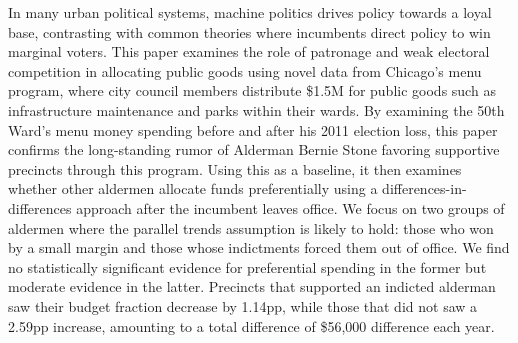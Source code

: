 \begin{spacing}{1.0}
    In many urban political systems, machine politics drives policy towards a loyal base, contrasting with common theories where incumbents direct policy to win marginal voters.
    This paper examines the role of patronage and weak electoral competition in allocating public goods using novel data from Chicago's menu program, where city council members distribute \$1.5M for public goods such as infrastructure maintenance and parks within their wards.
    By examining the 50th Ward's menu money spending before and after his 2011 election loss, this paper confirms the long-standing rumor of Alderman Bernie Stone favoring supportive precincts through this program.
    Using this as a baseline, it then examines whether other aldermen allocate funds preferentially using a differences-in-differences approach after the incumbent leaves office.
    We focus on two groups of aldermen where the parallel trends assumption is likely to hold: those who won by a small margin and those whose indictments forced them out of office.
    We find no statistically significant evidence for preferential spending in the former but moderate evidence in the latter.
    Precincts that supported an indicted alderman saw their budget fraction decrease by 1.14pp, while those that did not saw a 2.59pp increase, amounting to a total difference of \$56,000 difference each year.
\end{spacing}
